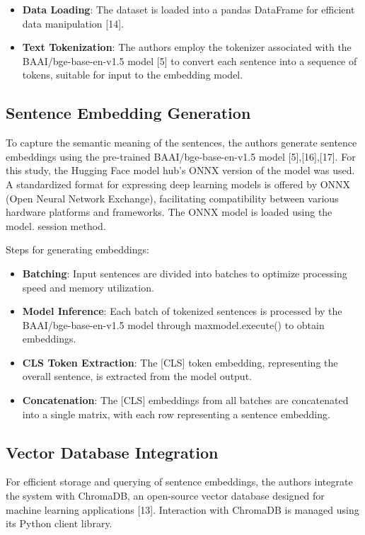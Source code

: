 \documentclass[conference]{IEEEtran}
\begin{document}
\begin{itemize}
    \item \textbf{Data Loading}: The dataset is loaded into a pandas DataFrame for efficient data manipulation [14].

    \item \textbf{Text Tokenization}: The authors employ the tokenizer associated with the BAAI/bge-base-en-v1.5 model [5] to convert each sentence into a sequence of tokens, suitable for input to the embedding model.
\end{itemize}

\subsection{Sentence Embedding Generation}
To capture the semantic meaning of the sentences, the authors generate sentence embeddings using the pre-trained BAAI/bge-base-en-v1.5 model [5],[16],[17]. For this study, the Hugging Face model hub's ONNX version of the model was used. A standardized format for expressing deep learning models is offered by ONNX (Open Neural Network Exchange), facilitating compatibility between various hardware platforms and frameworks. The ONNX model is loaded using the model. session method.

Steps for generating embeddings:
\begin{itemize}
    \item \textbf{Batching}: Input sentences are divided into batches to optimize processing speed and memory utilization.

    \item \textbf{Model Inference}: Each batch of tokenized sentences is processed by the BAAI/bge-base-en-v1.5 model through maxmodel.execute() to obtain embeddings.

    \item \textbf{CLS Token Extraction}: The [CLS] token embedding, representing the overall sentence, is extracted from the model output.

    \item \textbf{Concatenation}: The [CLS] embeddings from all batches are concatenated into a single matrix, with each row representing a sentence embedding.
\end{itemize}

\subsection{Vector Database Integration}
For efficient storage and querying of sentence embeddings, the authors integrate the system with ChromaDB, an open-source vector database designed for machine learning applications [13]. Interaction with ChromaDB is managed using its Python client library.
\end{document}
